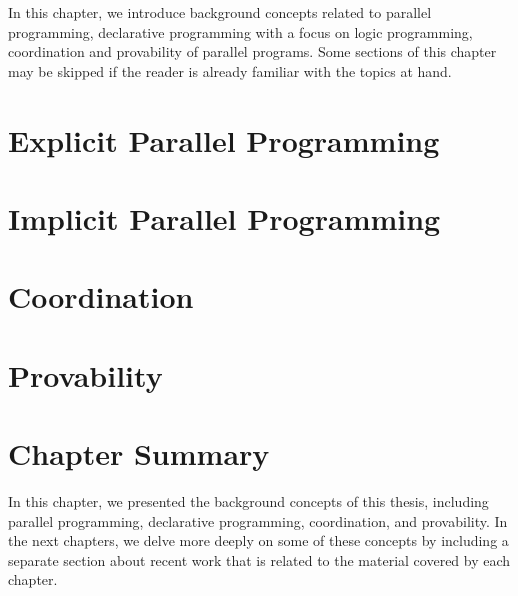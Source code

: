 In this chapter, we introduce background concepts related to parallel
programming, declarative programming with a focus on logic programming,
coordination and provability of parallel programs. Some sections of this chapter
may be skipped if the reader is already familiar with the topics at hand.

\section{Explicit Parallel Programming}


\section{Implicit Parallel Programming}\label{section:background:declarative}


\section{Coordination}\label{sec:background:coordination}


\section{Provability}

\section{Chapter Summary}

In this chapter, we presented the background concepts of this thesis, including
parallel programming, declarative programming, coordination, and provability. In
the next chapters, we delve more deeply on some of these concepts by including a
separate section about recent work that is related to the material covered by
each chapter.
